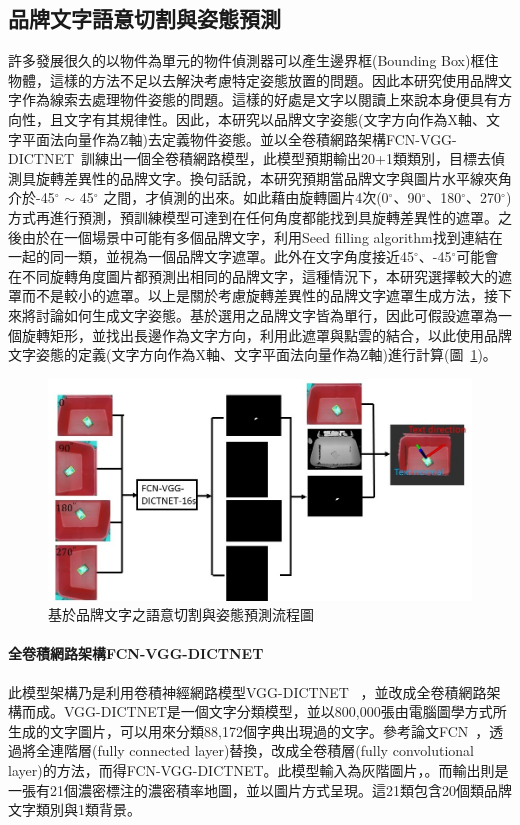 \subsection{品牌文字語意切割與姿態預測}
許多發展很久的以物件為單元的物件偵測器可以產生邊界框(Bounding Box)框住物體，這樣的方法不足以去解決考慮特定姿態放置的問題。因此本研究使用品牌文字作為線索去處理物件姿態的問題。這樣的好處是文字以閱讀上來說本身便具有方向性，且文字有其規律性。因此，本研究以品牌文字姿態(文字方向作為X軸、文字平面法向量作為Z軸)去定義物件姿態。並以全卷積網路架構FCN-VGG-DICTNET~\cite{peterthesis}訓練出一個全卷積網路模型，此模型預期輸出20+1類類別，目標去偵測具旋轉差異性的品牌文字。換句話說，本研究預期當品牌文字與圖片水平線夾角介於-45$^{\circ}$ $\sim$ 45$^{\circ}$ 之間，才偵測的出來。如此藉由旋轉圖片4次(0$^{\circ}$、90$^{\circ}$、180$^{\circ}$、270$^{\circ}$)方式再進行預測，預訓練模型可達到在任何角度都能找到具旋轉差異性的遮罩。之後由於在一個場景中可能有多個品牌文字，利用Seed filling algorithm找到連結在一起的同一類，並視為一個品牌文字遮罩。此外在文字角度接近45$^{\circ}$、-45$^{\circ}$可能會在不同旋轉角度圖片都預測出相同的品牌文字，這種情況下，本研究選擇較大的遮罩而不是較小的遮罩。以上是關於考慮旋轉差異性的品牌文字遮罩生成方法，接下來將討論如何生成文字姿態。基於選用之品牌文字皆為單行，因此可假設遮罩為一個旋轉矩形，並找出長邊作為文字方向，利用此遮罩與點雲的結合，以此使用品牌文字姿態的定義(文字方向作為X軸、文字平面法向量作為Z軸)進行計算(圖~\ref{figure:text-pose-extimation-pipeline})。

\begin{figure}[H]
	\centering
	\includegraphics[height=!, width=1.0\linewidth, keepaspectratio=true]
	{./figures/text-pose-extimation-pipeline.jpg}
  \caption{基於品牌文字之語意切割與姿態預測流程圖}
  \label{figure:text-pose-extimation-pipeline}
\end{figure}

\paragraph{全卷積網路架構FCN-VGG-DICTNET}
此模型架構乃是利用卷積神經網路模型VGG-DICTNET ~\cite{jaderberg2014synthetic}，並改成全卷積網路架構而成。VGG-DICTNET是一個文字分類模型，並以800,000張由電腦圖學方式所生成的文字圖片，可以用來分類88,172個字典出現過的文字。參考論文FCN~\cite{long2015fully}，透過將全連階層(fully connected layer)替換，改成全卷積層(fully convolutional layer)的方法，而得FCN-VGG-DICTNET。此模型輸入為灰階圖片，。而輸出則是一張有21個濃密標注的濃密積率地圖，並以圖片方式呈現。這21類包含20個類品牌文字類別與1類背景。

